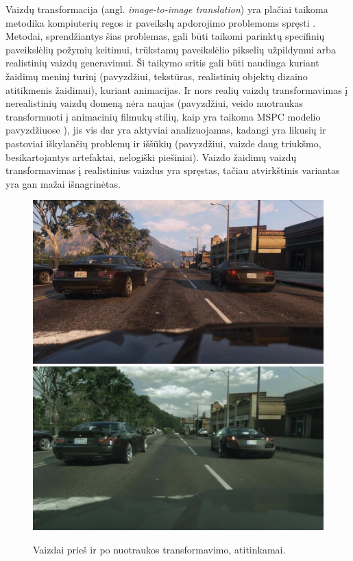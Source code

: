 \documentclass{VUMIFPSbakalaurinis}
\begin{document}
    Vaizdų transformacija (angl. \emph{image-to-image  translation}) yra plačiai taikoma metodika kompiuterių regos ir paveikslų apdorojimo problemoms spręsti \cite{ImTImTr}. Metodai, sprendžiantys šias problemas, gali būti taikomi parinktų specifinių paveikslėlių požymių keitimui, trūkstamų paveikslėlio pikselių užpildymui arba realistinių vaizdų generavimui. Ši taikymo sritis gali būti naudinga kuriant žaidimų meninį turinį (pavyzdžiui, tekstūras, realistinių objektų dizaino atitikmenis žaidimui), kuriant animacijas. Ir nors realių vaizdų transformavimas į nerealistinių vaizdų domeną nėra naujas (pavyzdžiui, veido nuotraukas transformuoti į animacinių filmukų stilių, kaip yra taikoma MSPC modelio pavyzdžiuose \cite{Mspc}), jis vis dar yra aktyviai analizuojamas, kadangi yra likusių ir pastoviai iškylančių problemų ir iššūkių (pavyzdžiui, vaizde daug triukšmo, besikartojantys artefaktai, nelogiški piešiniai). Vaizdo žaidimų vaizdų transformavimas į realistinius vaizdus yra spręstas, tačiau atvirkštinis variantas yra gan mažai išnagrinėtas.

    \begin{figure}[H]
        \centering
        \includegraphics[scale=0.3]{img/EnPhEn_before}
        \includegraphics[scale=0.3]{img/EnPhEn_after}
        \caption{Vaizdai prieš ir po nuotraukos transformavimo, atitinkamai.\cite{EnPhEn}}
        \label{img:mlp}
    \end{figure}
    
\end{document}
